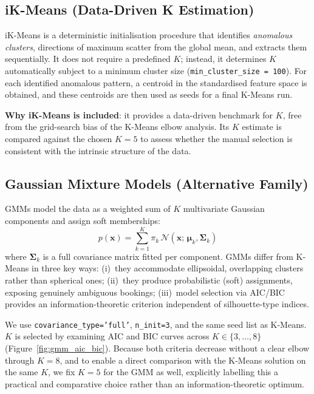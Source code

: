 \documentclass[12pt,a4paper]{article}
\begin{document}
\subsection{iK-Means (Data-Driven K Estimation)}
iK-Means \citep{mirkin2012} is a deterministic initialisation procedure
that identifies \emph{anomalous clusters}, directions of maximum
scatter from the global mean, and extracts them sequentially.
It does not require a predefined $K$; instead, it determines $K$
automatically subject to a minimum cluster size (\texttt{min\_cluster\_size = 100}).
For each identified anomalous pattern, a centroid in the
standardised feature space is obtained, and these centroids are then
used as seeds for a final K-Means run.

\textbf{Why iK-Means is included}: it provides a data-driven
benchmark for $K$, free from the grid-search bias of the K-Means elbow
analysis. Its $K$ estimate is compared against the chosen $K=5$ to
assess whether the manual selection is consistent with the intrinsic
structure of the data.

\subsection{Gaussian Mixture Models (Alternative Family)}
GMMs model the data as a weighted sum of $K$ multivariate Gaussian
components and assign soft memberships:
\begin{equation}
  p(\mathbf{x}) = \sum_{k=1}^K \pi_k\,\mathcal{N}(\mathbf{x};\,\boldsymbol{\mu}_k,\boldsymbol{\Sigma}_k)
\end{equation}
where $\boldsymbol{\Sigma}_k$ is a full covariance matrix fitted per
component.
GMMs differ from K-Means in three key ways: (i)~they accommodate
ellipsoidal, overlapping clusters rather than spherical ones;
(ii)~they produce probabilistic (soft) assignments, exposing genuinely
ambiguous bookings; (iii)~model selection via AIC/BIC provides an
information-theoretic criterion independent of silhouette-type indices.

We use \texttt{covariance\_type='full'}, \texttt{n\_init=3}, and the
same seed list as K-Means.
$K$ is selected by examining AIC and BIC curves across $K \in \{3,\ldots,8\}$
(Figure~\ref{fig:gmm_aic_bic}).
Because both criteria decrease without a clear elbow through $K=8$,
and to enable a direct comparison with the K-Means solution on the
same $K$, we fix $K=5$ for the GMM as well, explicitly labelling this
a practical and comparative choice rather than an information-theoretic optimum.
\end{document}
